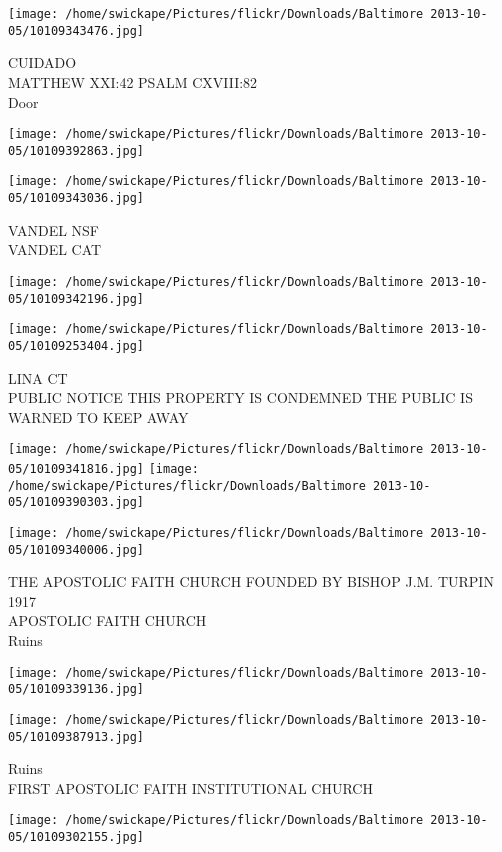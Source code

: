 \documentclass[10pt,letterpaper]{article}
\begin{document}
\texttt{[image: /home/swickape/Pictures/flickr/Downloads/Baltimore 2013-10-05/10109343476.jpg]}

CUIDADO\\
MATTHEW XXI:42 PSALM CXVIII:82\\
Door
\pagebreak

\texttt{[image: /home/swickape/Pictures/flickr/Downloads/Baltimore 2013-10-05/10109392863.jpg]}

\vspace{0.25in}
\texttt{[image: /home/swickape/Pictures/flickr/Downloads/Baltimore 2013-10-05/10109343036.jpg]}

VANDEL NSF\\
VANDEL CAT
\pagebreak

\texttt{[image: /home/swickape/Pictures/flickr/Downloads/Baltimore 2013-10-05/10109342196.jpg]}

\vspace{0.25in}
\texttt{[image: /home/swickape/Pictures/flickr/Downloads/Baltimore 2013-10-05/10109253404.jpg]}

LINA CT\\
PUBLIC NOTICE THIS PROPERTY IS CONDEMNED THE PUBLIC IS WARNED TO KEEP AWAY
\pagebreak

\texttt{[image: /home/swickape/Pictures/flickr/Downloads/Baltimore 2013-10-05/10109341816.jpg]}
\texttt{[image: /home/swickape/Pictures/flickr/Downloads/Baltimore 2013-10-05/10109390303.jpg]}

\vspace{0.25in}
\texttt{[image: /home/swickape/Pictures/flickr/Downloads/Baltimore 2013-10-05/10109340006.jpg]}

THE APOSTOLIC FAITH CHURCH FOUNDED BY BISHOP J.M. TURPIN 1917\\
APOSTOLIC FAITH CHURCH\\
Ruins
\pagebreak

\texttt{[image: /home/swickape/Pictures/flickr/Downloads/Baltimore 2013-10-05/10109339136.jpg]}

\vspace{0.25in}
\texttt{[image: /home/swickape/Pictures/flickr/Downloads/Baltimore 2013-10-05/10109387913.jpg]}

Ruins\\
FIRST APOSTOLIC FAITH INSTITUTIONAL CHURCH
\pagebreak

\texttt{[image: /home/swickape/Pictures/flickr/Downloads/Baltimore 2013-10-05/10109302155.jpg]}
\end{document}
